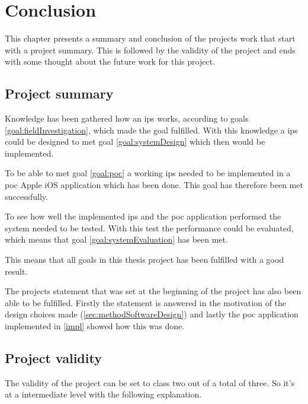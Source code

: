 \chapter{Conclusion}\label{conclusion}
This chapter presents a summary and conclusion of the projects work that start with a project summary.
This is followed by the validity of the project and ends with some thought about the future work for this project.


\section{Project summary}\label{sec:conclusionProjectSummary}
Knowledge has been gathered how an \acrfull{ips} works, according to goals \ref{goal:fieldInvestigation}, which made the goal fulfilled.
With this knowledge a \acrshort{ips} could be designed to met goal \ref{goal:systemDesign} which then would be implemented.

\bigskip

To be able to met goal \ref{goal:poc} a working \acrshort{ips} needed to be implemented in a \acrfull{poc} Apple iOS application which has been done.
This goal has therefore been met successfully.

\bigskip

To see how well the implemented \acrshort{ips} and the \acrshort{poc} application performed the system needed to be tested.
With this test the performance could be evaluated, which means that goal \ref{goal:systemEvaluation} has been met.

\bigskip

This means that all goals in this thesis project has been fulfilled with a good result.

\bigskip

The projects statement that was set at the beginning of the project has also been able to be fulfilled.
Firstly the statement is answered in the motivation of the design choices made (\cref{sec:methodSoftwareDesign}) and lastly the \acrshort{poc} application implemented in \cref{impl} showed how this was done.


\section{Project validity}\label{sec:conclusionProjectValidity}
The validity of the project can be set to class two out of a total of three.
So it's at a intermediate level with the following explanation.

\bigskip

